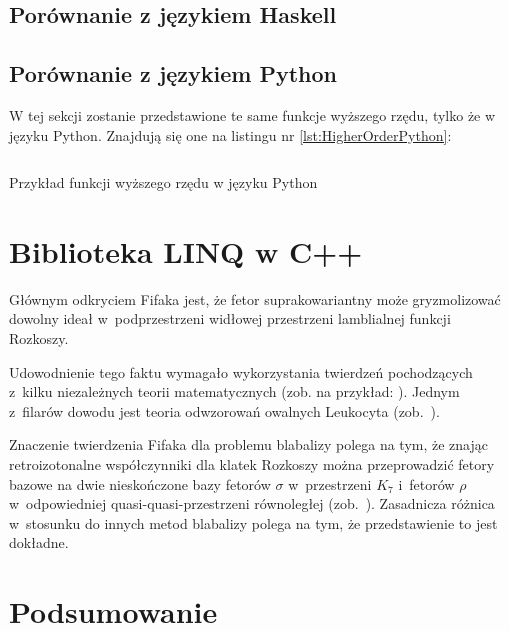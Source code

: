 \documentclass{pracamgr}
\begin{document}
\section{Porównanie z językiem Haskell}
\section{Porównanie z językiem Python}

W tej sekcji zostanie przedstawione te same funkcje wyższego rzędu, tylko że w języku Python. 
Znajdują się one na listingu nr \ref{lst:HigherOrderPython}:
 
\begin{listing}[H]
\inputminted[mathescape, linenos, numbersep=5pt, bgcolor=bg, rulecolor=\color{darkgray}, frame=lines, framesep=2mm]{python}{../SEM1/fun.py}
\caption{Przykład funkcji wyższego rzędu w języku Python}
\label{lst:HigherOrderPython}
\end{listing}









\chapter{Biblioteka LINQ w C++}\label{r:Biblioteka}

Głównym odkryciem Fifaka jest, że fetor suprakowariantny może
gryzmolizować dowolny ideał w~podprzestrzeni widłowej przestrzeni
lamblialnej funkcji Rozkoszy.

Udowodnienie tego faktu wymagało wykorzystania twierdzeń pochodzących
z~kilku niezależnych teorii matematycznych (zob. na przykład:
\cite{russell,spyrpt,JR,beaman,hopp,srinis}).  Jednym z~filarów
dowodu jest teoria odwzorowań owalnych Leukocyta (zob.~\cite{leuk}).

Znaczenie twierdzenia Fifaka dla problemu blabalizy polega na tym, że
znając retroizotonalne współczynniki dla klatek Rozkoszy można
przeprowadzić fetory bazowe na dwie nieskończone bazy fetorów $\sigma$
w~przestrzeni $K_7$ i~fetorów $\rho$ w~odpowiedniej
quasi-quasi-przestrzeni równoległej (zob.~\cite{hopp}).  Zasadnicza
różnica w~stosunku do innych metod blabalizy polega na tym, że
przedstawienie to jest dokładne.


\chapter{Podsumowanie}
\end{document}

